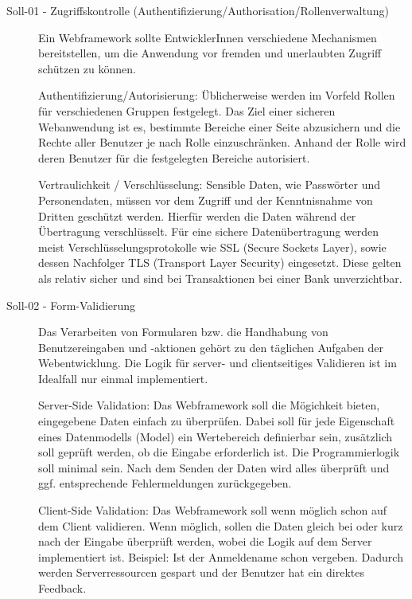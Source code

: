   \begin{description}

    \item[Soll-01 - Zugriffskontrolle
    (Authentifizierung/Authorisation/Rollenverwaltung)\label{itm:Soll-01}]

    Ein Webframework sollte EntwicklerInnen verschiedene Mechanismen
    bereitstellen, um die Anwendung vor fremden und unerlaubten Zugriff schützen
    zu können.

    Authentifizierung/Autorisierung: Üblicherweise werden im Vorfeld Rollen für
    verschiedenen Gruppen festgelegt. Das Ziel einer sicheren Webanwendung ist
    es, bestimmte Bereiche einer Seite abzusichern und die Rechte aller
    Benutzer je nach Rolle einzuschränken. Anhand der Rolle wird deren
    Benutzer für die festgelegten Bereiche autorisiert.

    Vertraulichkeit / Verschlüsselung: Sensible Daten, wie Passwörter und
    Personendaten, müssen vor dem Zugriff und der Kenntnisnahme von Dritten
    geschützt werden. Hierfür werden die Daten während der Übertragung
    verschlüsselt. Für eine sichere Datenübertragung werden meist
    Verschlüsselungsprotokolle wie SSL (Secure Sockets Layer), sowie dessen
    Nachfolger TLS (Transport Layer Security) eingesetzt. Diese gelten als
    relativ sicher und sind bei Transaktionen bei einer Bank unverzichtbar.

    \item[Soll-02 - Form-Validierung\label{itm:Soll-02}]
    Das Verarbeiten von Formularen bzw. die Handhabung von Benutzereingaben und
    -aktionen gehört zu den täglichen Aufgaben der Webentwicklung. Die Logik
    für server- und clientseitiges Validieren ist im Idealfall nur einmal
    implementiert.

    Server-Side Validation: Das Webframework soll die Mögichkeit bieten,
    eingegebene Daten einfach zu überprüfen. Dabei soll für jede Eigenschaft
    eines Datenmodells (Model) ein Wertebereich definierbar sein, zusätzlich
    soll geprüft werden, ob die Eingabe erforderlich ist. Die Programmierlogik
    soll minimal sein. Nach dem Senden der Daten wird alles überprüft und ggf.
    entsprechende Fehlermeldungen zurückgegeben.

    Client-Side Validation: Das Webframework soll wenn möglich schon auf dem
    Client validieren. Wenn möglich, sollen die Daten gleich bei oder kurz nach
    der Eingabe überprüft werden, wobei die Logik auf dem Server implementiert
    ist. Beispiel: Ist der Anmeldename schon vergeben. Dadurch werden
    Serverressourcen gespart und der Benutzer hat ein direktes Feedback.


\end{description}
